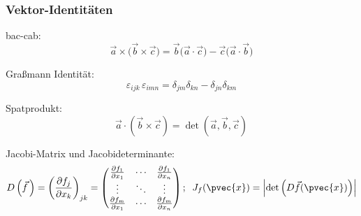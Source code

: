 \documentclass[11pt]{article}
\numberwithin{equation}{section}
\begin{document}
      \subsubsection{Vektor-Identitäten}
        bac-cab:
        \begin{equation}
          \vec{a}\times\big(\vec{b}\times\vec{c}\big) = \vec{b}\big(\vec{a}\cdot\vec{c}\big) - \vec{c}\big(\vec{a}\cdot\vec{b}\big)
        \end{equation}

        Graßmann Identität:
        \begin{equation}
          \varepsilon_{ijk}\,\varepsilon_{imn}=\delta_{jm}\delta_{kn}-\delta_{jn}\delta_{km}
        \end{equation}

        Spatprodukt:
        \begin{equation}
          \vec{a}\cdot\left(\vec{b}\times\vec{c}\right) = \det\left(\vec{a},\vec{b},\vec{c}\right)
        \end{equation}

    		Jacobi-Matrix und Jacobideterminante:
    		\begin{equation}
    			D\left(\vec{f}\,\right) = \left(\frac{\partial f_j}{\partial x_k}\right)_{jk}
    			= \left(\begin{matrix}
    			\frac{\partial f_1}{\partial x_1} & \dotsb & \frac{\partial f_1}{\partial x_n} \\
    			\vdots & \ddots & \vdots \\
    			\frac{\partial f_m}{\partial x_1} & \dotsb & \frac{\partial f_m}{\partial x_n} \\
    			\end{matrix}\right);\;\;J_f(\pvec{x})=\left|\det\left(D\vec{f}(\pvec{x})\right)\right|
    		\end{equation}
\end{document}
